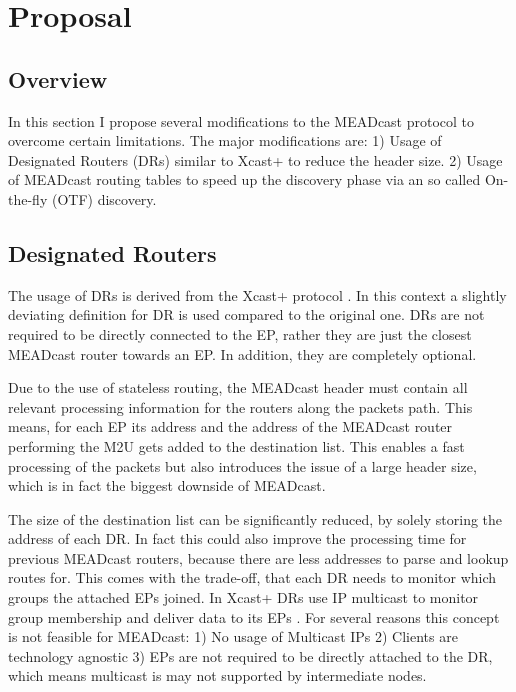 \chapter{Proposal}

\section{Overview} %
\label{sec:Overview}
In this section I propose several modifications to the MEADcast protocol to 
overcome certain limitations.
The major modifications are:
1) Usage of Designated Routers (DRs) similar to Xcast+ \cite{xcast+} to reduce
the header size.
2) Usage of MEADcast routing tables to speed up the discovery phase via an so
called On-the-fly (OTF) discovery.



\section{Designated Routers} %
\label{sec:Designated Routers}
The usage of DRs is derived from the Xcast+ protocol \cite{xcast+}.
In this context a slightly deviating definition for DR is used compared to the 
original one.
DRs are not required to be directly connected to the EP, rather they are just 
the closest MEADcast router towards an EP.
In addition, they are completely optional.

Due to the use of stateless routing, the MEADcast header must contain all
relevant processing information for the routers along the packets path.
This means, for each EP its address and the address of the MEADcast router
performing the M2U gets added to the destination list.
This enables a fast processing of the packets but also introduces the issue of a
large header size, which is in fact the biggest downside of MEADcast.

The size of the destination list can be significantly reduced, by solely storing
the address of each DR.
In fact this could also improve the processing time for previous MEADcast
routers, because there are less addresses to parse and lookup routes for.
This comes with the trade-off, that each DR needs to monitor which groups the 
attached EPs joined.
In Xcast+ DRs use IP multicast to monitor group membership and deliver data to 
its EPs \cite{xcast+}.
For several reasons this concept is not feasible for MEADcast: 
1) No usage of Multicast IPs
2) Clients are technology agnostic
3) EPs are not required to be directly attached to the DR, which means multicast
is may not supported by intermediate nodes.

